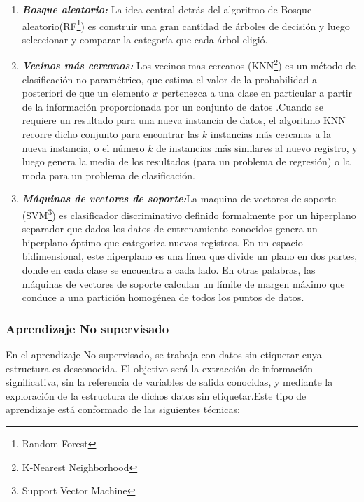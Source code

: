 \begin{enumerate}[label=\textbf{\arabic*})]
\begin{enumerate}[label=\textbf{(\alph*)}]
		\item \textit{\textbf{Bosque aleatorio:}}
		La idea central detrás del algoritmo de Bosque aleatorio(RF\footnote{Random Forest}) es construir una gran cantidad de árboles de decisión y luego seleccionar y comparar la categoría que cada árbol eligió\cite{Roman2019}. 
		
		\item \textit{\textbf{Vecinos más cercanos:}}
		Los vecinos mas cercanos (KNN\footnote{K-Nearest Neighborhood}) es un método de clasificación no paramétrico, que estima el valor de la probabilidad a posteriori de que un elemento $x$ pertenezca a una clase en particular a partir de la información proporcionada por un conjunto de datos .Cuando se requiere un resultado para una nueva instancia de datos, el algoritmo KNN recorre dicho conjunto para encontrar las $k$ instancias más cercanas a la nueva instancia, o el número $k$ de instancias más similares al nuevo registro, y luego genera la media de los resultados (para un problema de regresión) o la moda para un problema de clasificación\cite{Shaw2019}.
		
		\item \textit{\textbf{Máquinas de vectores de soporte:}}La maquina de vectores de soporte (SVM\footnote{Support Vector Machine}) es clasificador discriminativo definido formalmente por un hiperplano separador que dados los datos de entrenamiento conocidos genera un hiperplano óptimo que categoriza nuevos registros. En un espacio bidimensional, este hiperplano es una línea que divide un plano en dos partes, donde en cada clase se encuentra a cada lado. En otras palabras, las máquinas de vectores de soporte calculan un límite de margen máximo que conduce a una partición homogénea de todos los puntos de datos\cite{Patel2017}. 
	\end{enumerate}
	
\end{enumerate}

\subsubsection{Aprendizaje No supervisado}
En el aprendizaje No supervisado, se trabaja con datos sin etiquetar cuya estructura es desconocida. El objetivo será la extracción de información significativa, sin la referencia de variables de salida conocidas, y mediante la exploración de la estructura de dichos datos sin etiquetar\cite{BriegaLopez2015}.Este tipo de aprendizaje está conformado de las siguientes técnicas:

